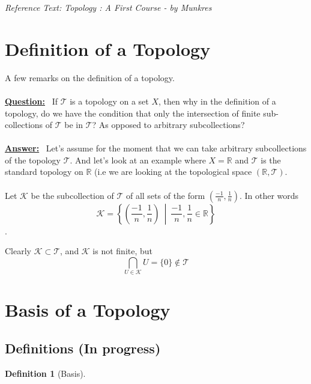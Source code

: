 \documentclass{article}
\theoremstyle{remark}
\theoremstyle{definition}
\newtheorem{definition}{Definition}[section]
\begin{document}
\begin{flushleft}
\textit{Reference Text: Topology : A First Course - by Munkres}

\end{flushleft}

\newpage

\section{Definition of a Topology}

A few remarks on the definition of a topology. 
\\ \\
\textbf{\underline{Question:}} 
\ If $\mathcal{T}$ is a topology on a set $X$, then why in the definition of a topology, do we have the condition that only the intersection of finite sub-collections of $\mathcal{T}$ be in $\mathcal{T}$? As opposed to arbitrary subcollections?
\\ \\
\textbf{\underline{Answer:}} 
\ Let's assume for the moment that we can take arbitrary subcollections of the topology $\mathcal{T}$. And let's look at an example where $X = \mathbb{R}$ and $\mathcal{T}$ is the standard topology on $\mathbb{R}$ (i.e we are looking at the topological space $(\mathbb{R}, \mathcal{T})$.
\\ \\
Let $\mathcal{K}$ be the subcollection of $\mathcal{T}$ of all sets of the form $(\frac{-1}{n}, \frac{1}{n})$. In other words $$\mathcal{K} = \left\{\left(\frac{-1}{n}, \frac{1}{n}\right) \ \middle| \ \frac{-1}{n}, \frac{1}{n} \in \mathbb{R}\right\}$$.

Clearly $\mathcal{K} \subset \mathcal{T}$, and $\mathcal{K}$ is not finite, but $$\bigcap_{U \in \mathcal{K}} U = \{0\} \not\in \mathcal{T}$$

\newpage


\section{Basis of a Topology}

\subsection{Definitions (In progress)}

\begin{definition}[Basis]

\end{definition}
\end{document}
